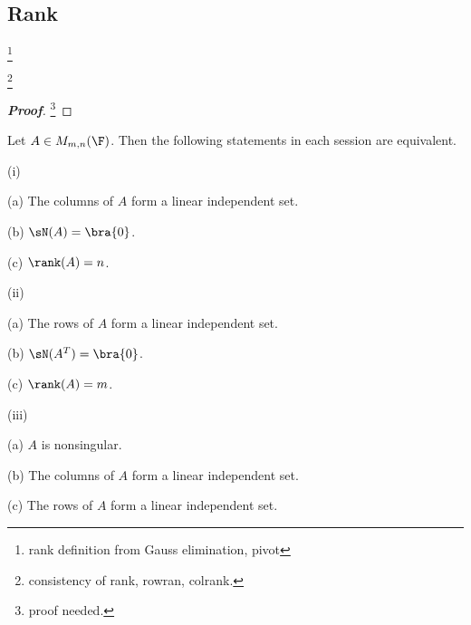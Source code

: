 


\subsection{Rank}%

\footnote{rank definition from Gauss elimination, pivot}

\begin{theorem}[rank]
\footnote{consistency of rank, rowran, colrank.}
\end{theorem}

\begin{proof}[\bf Proof]
\footnote{proof needed.}
\end{proof}




\begin{proposition}
Let $A\in M_{m,n}(\F)$. Then the following statements in each session are equivalent.
\ben
\item [(i)] \ben
\item [(a)] The columns of $A$ form a linear independent set.
\item [(b)] $\sN(A) = \bra{0}$.
\item [(c)] $\rank(A) = n$.
\een

\item [(ii)] \ben
\item [(a)] The rows of $A$ form a linear independent set.
\item [(b)] $\sN(A^T) = \bra{0}$.
\item [(c)] $\rank(A) = m$.
\een

\item [(iii)] \ben
\item [(a)] $A$ is nonsingular.
\item [(b)] The columns of $A$ form a linear independent set.
\item [(c)] The rows of $A$ form a linear independent set.
\een
\een
\end{proposition}




